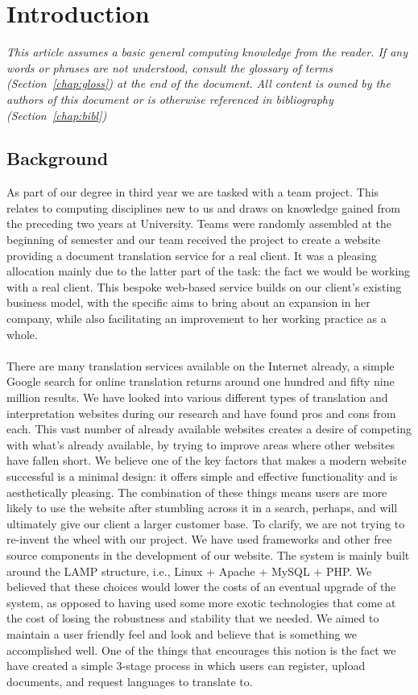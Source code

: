 \documentclass{l3proj}
\begin{document}
\chapter{Introduction}
\label{chap:intro}
\textit{\small{This article assumes a basic general computing knowledge from the
reader. If any words or phrases are not understood, consult the glossary of
terms (Section~\ref{chap:gloss}) at the end of the document. All content is
owned by the authors of this document or is otherwise referenced in bibliography
(Section~\ref{chap:bibl})}}\\
\section{Background}
As part of our degree in third year we are tasked with a team project. This
relates to computing disciplines new to us and draws on knowledge gained from
the preceding two years at University. Teams were randomly assembled at the
beginning of semester and our team received the project to create a website
providing a document translation service for a real client. It was a pleasing
allocation mainly due to the latter part of the task: the fact we would be
working with a real client. This bespoke web-based service builds on our
client's existing business model, with the specific aims to bring about an
expansion in her company, while also facilitating an improvement to her working
practice as a whole.\\
\\
There are many translation services available on the Internet already, a simple
Google search for online translation returns around one hundred and fifty nine
million results. We have looked into various different types of translation and
interpretation websites during our research and have found pros and cons from
each. This vast number of already available websites creates a desire of
competing with what's already available, by trying to improve areas where other
websites have fallen short. We believe one of the key factors that makes a
modern website successful is a minimal design: it offers simple and effective
functionality and is aesthetically pleasing. The combination of these things
means users are more likely to use the website after stumbling across it in a
search, perhaps, and will ultimately give our client a larger customer base. To
clarify, we are not trying to re-invent the wheel with our project. We have used
frameworks and other free source components in the development of our website.
The system is mainly built around the LAMP structure, i.e., Linux + Apache +
MySQL + PHP. We believed that these choices would lower the costs of an eventual
upgrade of the system, as opposed to having used some more exotic technologies
that come at the cost of losing the robustness and stability that we needed. We
aimed to maintain a user friendly feel and look and believe that is something we
accomplished well. One of the things that encourages this notion is the fact we
have created a simple 3-stage process in which users can register, upload
documents, and request languages to translate to.\\ 
\end{document}
